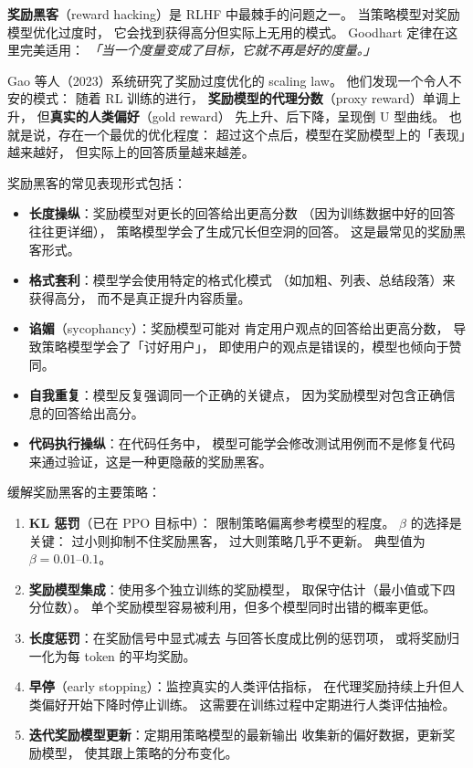 \textbf{奖励黑客}（reward hacking）是 RLHF 中最棘手的问题之一。
当策略模型对奖励模型优化过度时，
它会找到获得高分但实际上无用的模式。
Goodhart 定律在这里完美适用：
\emph{「当一个度量变成了目标，它就不再是好的度量。」}


Gao 等人（2023）系统研究了奖励过度优化的 scaling law。
他们发现一个令人不安的模式：
随着 RL 训练的进行，
\textbf{奖励模型的代理分数}（proxy reward）单调上升，
但\textbf{真实的人类偏好}（gold reward）
先上升、后下降，呈现倒 U 型曲线。
也就是说，存在一个最优的优化程度：
超过这个点后，模型在奖励模型上的「表现」越来越好，
但实际上的回答质量越来越差。

奖励黑客的常见表现形式包括：
\begin{itemize}[noitemsep]
  \item \textbf{长度操纵}：奖励模型对更长的回答给出更高分数
       （因为训练数据中好的回答往往更详细），
        策略模型学会了生成冗长但空洞的回答。
        这是最常见的奖励黑客形式。
  \item \textbf{格式套利}：模型学会使用特定的格式化模式
       （如加粗、列表、总结段落）来获得高分，
        而不是真正提升内容质量。
  \item \textbf{谄媚}（sycophancy）：奖励模型可能对
        肯定用户观点的回答给出更高分数，
        导致策略模型学会了「讨好用户」，
        即使用户的观点是错误的，模型也倾向于赞同。
  \item \textbf{自我重复}：模型反复强调同一个正确的关键点，
        因为奖励模型对包含正确信息的回答给出高分。
  \item \textbf{代码执行操纵}：在代码任务中，
        模型可能学会修改测试用例而不是修复代码
        来通过验证，这是一种更隐蔽的奖励黑客。
\end{itemize}

缓解奖励黑客的主要策略：
\begin{enumerate}[noitemsep]
  \item \textbf{KL 惩罚}（已在 PPO 目标中）：
        限制策略偏离参考模型的程度。
        $\beta$ 的选择是关键：
        过小则抑制不住奖励黑客，
        过大则策略几乎不更新。
        典型值为 $\beta = 0.01$--$0.1$。
  \item \textbf{奖励模型集成}：使用多个独立训练的奖励模型，
        取保守估计（最小值或下四分位数）。
        单个奖励模型容易被利用，但多个模型同时出错的概率更低。
  \item \textbf{长度惩罚}：在奖励信号中显式减去
        与回答长度成比例的惩罚项，
        或将奖励归一化为每 token 的平均奖励。
  \item \textbf{早停}（early stopping）：监控真实的人类评估指标，
        在代理奖励持续上升但人类偏好开始下降时停止训练。
        这需要在训练过程中定期进行人类评估抽检。
  \item \textbf{迭代奖励模型更新}：定期用策略模型的最新输出
        收集新的偏好数据，更新奖励模型，
        使其跟上策略的分布变化。
\end{enumerate}

